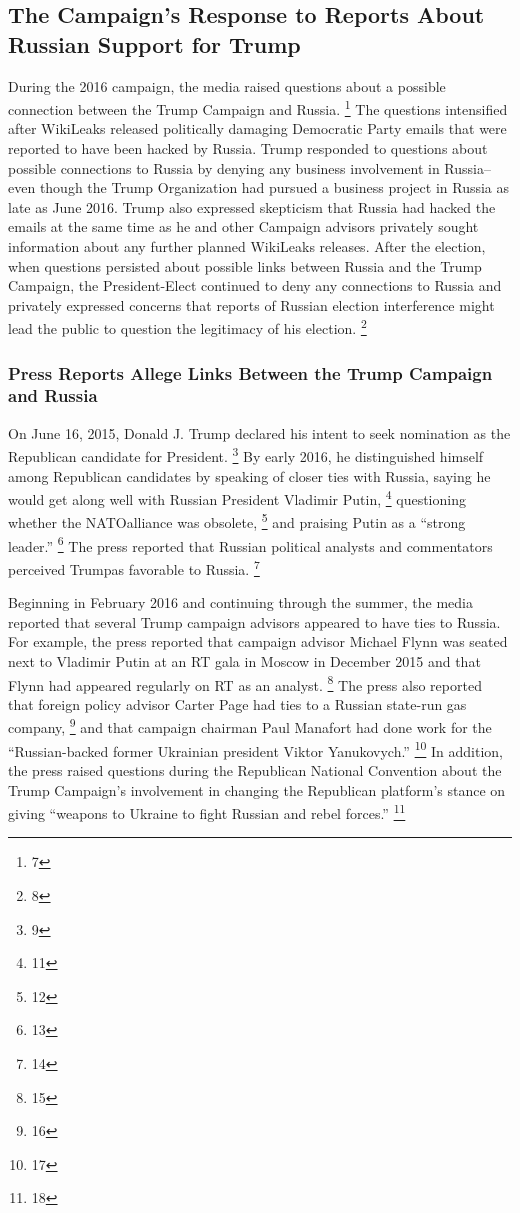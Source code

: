 \subsection{The Campaign's Response to Reports About Russian Support for Trump}
During the 2016 campaign, the media raised questions about a possible connection between the Trump Campaign and Russia.%
\footnote{7}
The questions intensified after WikiLeaks released politically damaging Democratic Party emails that were reported to have been hacked by Russia. 
Trump responded to questions about possible connections to Russia by denying any business involvement in Russia--even though the Trump Organization had pursued a business project in Russia as late as June 2016. 
Trump also expressed skepticism that Russia had hacked the emails at the same time as he and other Campaign advisors privately sought information about any further planned WikiLeaks releases. 
After the election, when questions persisted about possible links between Russia and the Trump Campaign, the President-Elect continued to deny any connections to Russia and privately expressed concerns that reports of Russian election interference might lead the public to question the legitimacy of his election.%
\footnote{8}

\subsubsection{Press Reports Allege Links Between the Trump Campaign and Russia}
On June 16, 2015, Donald J. Trump declared his intent to seek nomination as the Republican candidate for President.%
\footnote{9}
By early 2016, he distinguished himself among Republican candidates by speaking of closer ties with Russia,%
saying he would get along well with Russian President Vladimir Putin,%
\footnote{11}
questioning whether the NATOalliance was obsolete,%
\footnote{12}
and praising Putin as a ``strong leader.''%
\footnote{13}
The press reported that Russian political analysts and commentators perceived Trumpas favorable to Russia.%
\footnote{14}

Beginning in February 2016 and continuing through the summer, the media reported that several Trump campaign advisors appeared to have ties to Russia. 
For example, the press reported that campaign advisor Michael Flynn was seated next to Vladimir Putin at an RT gala in Moscow in December 2015 and that Flynn had appeared regularly on RT as an analyst.%
\footnote{15}
The press also reported that foreign policy advisor Carter Page had ties to a Russian state-run gas company,%
\footnote{16} 
and that campaign chairman Paul Manafort had done work for the ``Russian-backed former Ukrainian president Viktor Yanukovych.''%
\footnote{17}
In addition, the press raised questions during the Republican National Convention about the Trump Campaign's involvement in changing the Republican platform's stance on giving ``weapons to Ukraine to fight Russian and rebel forces.''%
\footnote{18}

